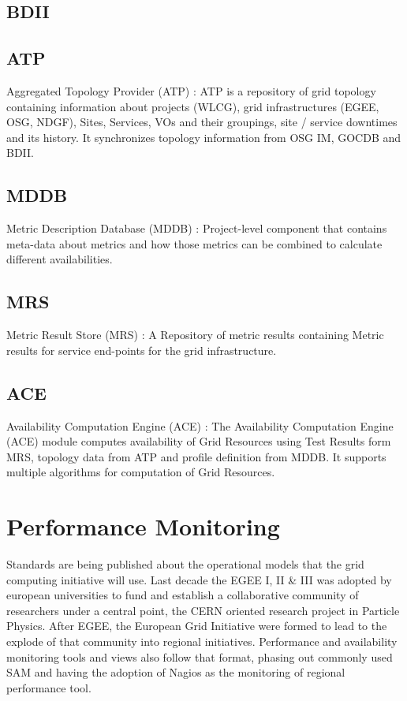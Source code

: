 \subsection{BDII}


\subsection{ATP}
Aggregated Topology Provider (ATP) : ATP is a repository of grid topology
containing information about projects (WLCG), grid infrastructures (EGEE, OSG,
NDGF), Sites, Services, VOs and their groupings, site / service downtimes and
its history. It synchronizes topology information from OSG IM, GOCDB and BDII.

\subsection{MDDB}
Metric Description Database (MDDB) : Project-level component that contains
meta-data about metrics and how those metrics can be combined to calculate
different availabilities.

\subsection{MRS}
Metric Result Store (MRS) : A Repository of metric results containing Metric
results for service end-points for the grid infrastructure.

\subsection{ACE}
Availability Computation Engine (ACE) : The Availability Computation Engine
(ACE) module computes availability of Grid Resources using Test Results form
MRS, topology data from ATP and profile definition from MDDB. It supports
multiple algorithms for computation of Grid Resources.



\section{Performance Monitoring}
Standards are being published about the operational models that the grid
computing initiative will use. Last decade the EGEE I, II \& III was adopted by
european universities to fund and establish a collaborative community of
researchers under a central point, the CERN oriented research project in
Particle Physics. After EGEE, the European Grid Initiative were formed to lead
to the explode of that community into regional initiatives. Performance
and availability monitoring tools and views also follow that format, phasing out
commonly used SAM \cite{egee3dsa122} and having the adoption of Nagios as the
monitoring of regional performance tool.



